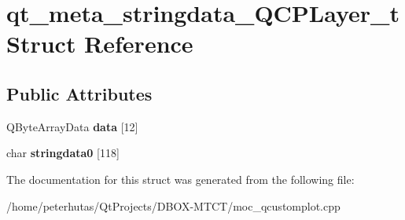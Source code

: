 \hypertarget{structqt__meta__stringdata___q_c_p_layer__t}{}\section{qt\+\_\+meta\+\_\+stringdata\+\_\+\+Q\+C\+P\+Layer\+\_\+t Struct Reference}
\label{structqt__meta__stringdata___q_c_p_layer__t}
\subsection*{Public Attributes}
\begin{DoxyCompactItemize}
\item 
\mbox{\label{structqt__meta__stringdata___q_c_p_layer__t_a8c36428e0f14ee3bf9fb37ad1719be47}} 
Q\+Byte\+Array\+Data {\bfseries data} \mbox{[}12\mbox{]}
\item 
\mbox{\label{structqt__meta__stringdata___q_c_p_layer__t_a823b98e98042cc0f3c0c9b73fcd0f226}} 
char {\bfseries stringdata0} \mbox{[}118\mbox{]}
\end{DoxyCompactItemize}


The documentation for this struct was generated from the following file\+:\begin{DoxyCompactItemize}
\item 
/home/peterhutas/\+Qt\+Projects/\+D\+B\+O\+X-\/\+M\+T\+C\+T/moc\+\_\+qcustomplot.\+cpp\end{DoxyCompactItemize}
